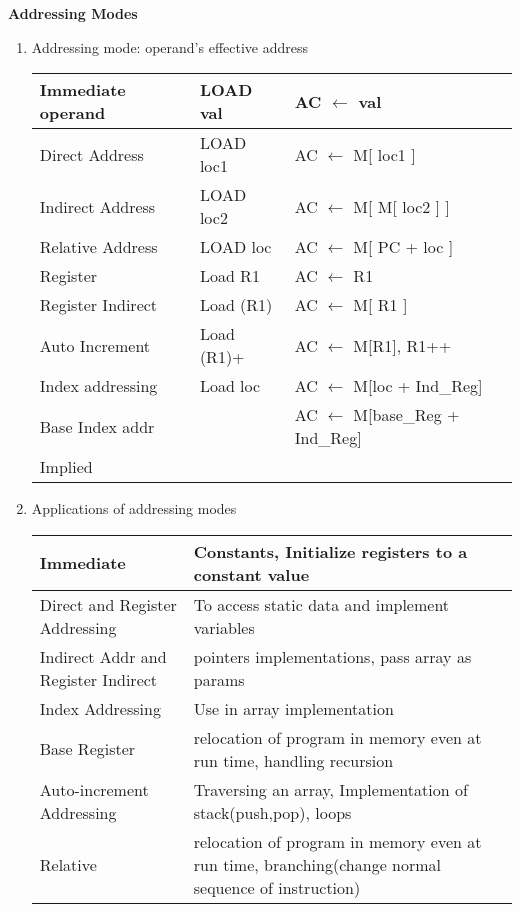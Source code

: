 
\centerline{\textbf{ \LARGE Addressing Modes}}

\begin{enumerate}
    \item Addressing mode: operand’s effective address \\
     \begin{myTableStyle} \begin{tabular}{ |m{3.2cm}|m{2cm}|m{5cm}| } \hline
      Immediate operand & LOAD val    & AC \(\leftarrow\) val   \\ \hline
      Direct Address    & LOAD loc1   & AC \(\leftarrow\) M[ loc1 ]  \\ \hline
      Indirect Address  & LOAD loc2   & AC \(\leftarrow\) M[ M[ loc2 ] ]   \\ \hline
      Relative Address  & LOAD loc    & AC \(\leftarrow\) M[ PC + loc ]  \\ \hline
      Register          & Load R1     & AC \(\leftarrow\) R1  \\ \hline
      Register Indirect & Load (R1)   & AC \(\leftarrow\) M[ R1 ]  \\ \hline
      Auto Increment    & Load (R1)+  & AC \(\leftarrow\) M[R1],  R1++  \\ \hline
      Index addressing  & Load loc    & AC \(\leftarrow\) M[loc + Ind\_Reg]\\ \hline
      Base Index addr   &             & AC \(\leftarrow\) M[base\_Reg + Ind\_Reg]\\ \hline
      Implied & & \\ \hline
      \end{tabular} \end{myTableStyle} \vspace{0.08in}

    \item Applications of addressing modes\\
     \begin{myTableStyle} \begin{tabular}{ |m{5.5cm}|m{10.5cm}| } \hline
      Immediate & Constants, Initialize registers to a constant value  \\ \hline
      Direct and Register Addressing &  To access static data and implement variables \\ \hline
      Indirect Addr and Register Indirect & pointers implementations, pass array as params \\ \hline
      Index Addressing & Use in array implementation \\ \hline
      Base Register  & relocation of program in memory even at run time, handling recursion \\ \hline
      Auto-increment Addressing & Traversing an array, Implementation of stack(push,pop), loops \\ \hline
      Relative & relocation of program in memory even at run time, branching(change normal sequence of instruction) \\ \hline
      \end{tabular} \end{myTableStyle} \vspace{0.08in}



\end{enumerate}
